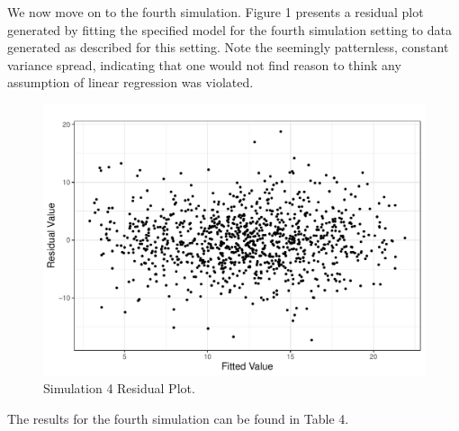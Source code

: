 \documentclass[review]{elsarticle}
\begin{document}
We now move on to the fourth simulation. Figure 1 presents a residual plot generated by fitting the specified model for the fourth simulation setting to data generated as described for this setting.
Note the seemingly patternless, constant variance spread, indicating that one would not find reason to think any assumption of linear regression was violated. 

\begin{figure}[H]
\includegraphics[width=4.5in]{figures/sim3_residual_plot.pdf}\par
\caption{Simulation 4 Residual Plot.}
\centering
\end{figure}

The results for the fourth simulation can be found in Table 4.

\begin{table}[H]
	\centering
	\small\addtolength{\tabcolsep}{-3pt}
	\setlength\extrarowheight{-3pt}
	{
	}
	\end{table}
\end{document}
